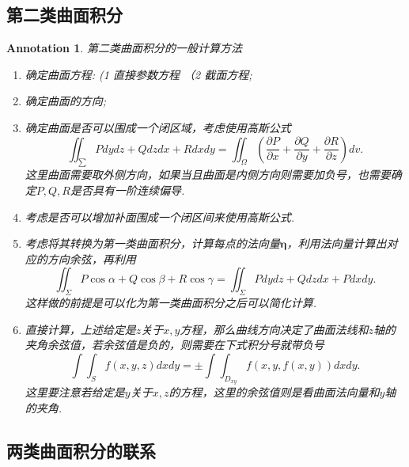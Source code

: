 \documentclass{article}
\newtheorem{annotation}[theorem]{Annotation}
\begin{document}
\subsection{第二类曲面积分}

\begin{annotation}
\rm 第二类曲面积分的一般计算方法
\begin{enumerate}
	\item 确定曲面方程: (1 直接参数方程 （2 截面方程; 
	\item 确定曲面的方向;
	\item 确定曲面是否可以围成一个闭区域，考虑使用高斯公式
	$$
	\iint_\sum Pdydz + Qdzdx + Rdxdy = \iint_\Omega \left(\frac{\partial P}{\partial x}+\frac{\partial Q}{\partial y}+\frac{\partial R}{\partial z} \right) dv.
	$$
	这里曲面需要取外侧方向，如果当且曲面是内侧方向则需要加负号，也需要确定$P,Q,R$是否具有一阶连续偏导. 
	\item 考虑是否可以增加补面围成一个闭区间来使用高斯公式. 
	\item 考虑将其转换为第一类曲面积分，计算每点的法向量$\bm{\eta}$，利用法向量计算出对应的方向余弦，再利用
	$$
	\iint_\Sigma P\cos\alpha + Q\cos\beta + R\cos\gamma = \iint_\Sigma Pdydz + Qdzdx + Pdxdy. 
	$$
	这样做的前提是可以化为第一类曲面积分之后可以简化计算. 
	\item 直接计算，上述给定是$z$关于$x,y$方程，那么曲线方向决定了曲面法线和$z$轴的夹角余弦值，若余弦值是负的，则需要在下式积分号就带负号
	$$
	\int\int_{S} f(x,y,z)dxdy = \pm \int\int_{D_{xy}} f(x,y,f(x,y))dxdy.
	$$
	这里要注意若给定是$y$关于$x,z$的方程，这里的余弦值则是看曲面法向量和$y$轴的夹角. 
\end{enumerate}
\end{annotation}

\subsection{两类曲面积分的联系}
\end{document}
